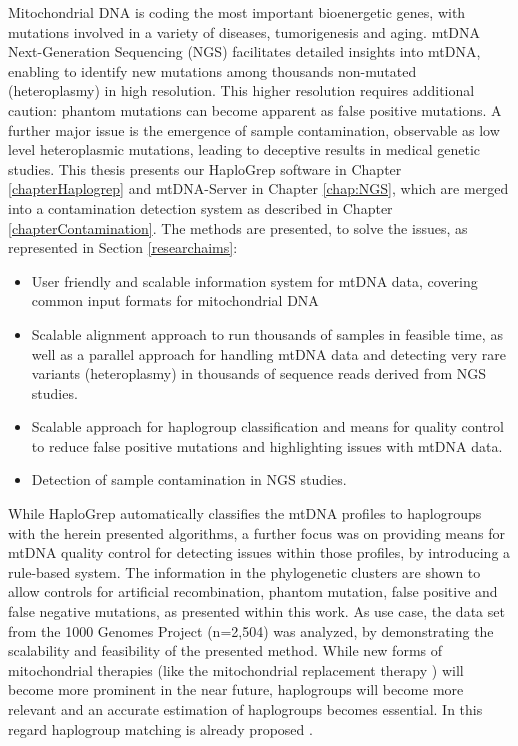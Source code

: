 Mitochondrial DNA is coding the most important bioenergetic genes, with mutations involved in a variety of diseases, tumorigenesis and aging. mtDNA Next-Generation Sequencing (NGS) facilitates detailed insights into mtDNA, enabling to identify new mutations among thousands non-mutated (heteroplasmy) in high resolution. This higher resolution requires additional caution: phantom mutations can become apparent as false positive mutations. A further major issue is the emergence of sample contamination, observable as low level heteroplasmic mutations, leading to deceptive results in medical genetic studies.
This thesis presents our HaploGrep software in Chapter \ref{chapterHaplogrep} and mtDNA-Server in Chapter \ref{chap:NGS}, which are merged into a contamination detection system as described in Chapter \ref{chapterContamination}. The methods are presented, to solve the issues, as represented in Section \ref{researchaims}:
\begin{itemize}

\item User friendly and scalable information system for mtDNA data, covering common input formats for mitochondrial DNA 
\item Scalable alignment approach to run thousands of samples in feasible time, as well as a parallel approach for handling mtDNA data and detecting very rare variants (heteroplasmy) in thousands of sequence reads derived from NGS studies.
\item Scalable approach for haplogroup classification and means for quality control to reduce false positive mutations and highlighting issues with mtDNA data.
\item Detection of sample contamination in NGS studies.
\end{itemize}
While HaploGrep automatically classifies the mtDNA profiles to haplogroups with the herein presented algorithms, a further focus was on providing means for mtDNA quality control for detecting issues within those profiles, by introducing a rule-based system. The information in the phylogenetic clusters are shown to allow controls for artificial recombination, phantom mutation, false positive and false negative mutations, as presented within this work. As use case, the data set from the 1000 Genomes Project (n=2,504) was analyzed, by demonstrating the scalability and feasibility of the presented method. While new forms of mitochondrial therapies (like the mitochondrial replacement therapy \cite{Falk2016}) will become more prominent in the near future, haplogroups will become more relevant and an accurate estimation of haplogroups becomes essential. In this regard haplogroup matching is already proposed \cite{Royrvik2016}.

